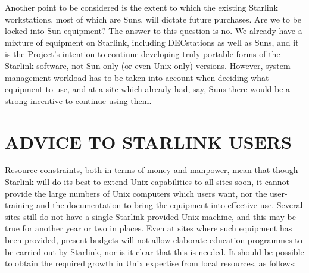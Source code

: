 Another point to be considered is the extent to which the existing
Starlink workstations, most of which are Suns, will dictate future
purchases.  Are we to be locked into Sun equipment?  The answer to this
question is no.  We already have a mixture of equipment on Starlink,
including DECstations as well as Suns, and it is the Project's intention
to continue developing truly portable forms of the Starlink software,
not Sun-only (or even Unix-only) versions.  However, system management
workload has to be taken into account when deciding what equipment to
use, and at a site which already had, say, Suns there would be a strong
incentive to continue using them.

\section{ADVICE TO STARLINK USERS}
Resource constraints, both in terms of money and manpower, mean that
though Starlink will do its best to extend Unix capabilities to all
sites soon, it cannot provide the large numbers of Unix computers which
users want, nor the user-training and the documentation to bring the
equipment into effective use.  Several sites still do not have a
single Starlink-provided Unix machine, and this may be true for another
year or two in places.  Even at sites where such equipment has been
provided, present budgets will not allow elaborate education programmes
to be carried out by Starlink, nor is it clear that this is needed.  It
should be possible to obtain the required growth in Unix expertise from
local resources, as follows:

